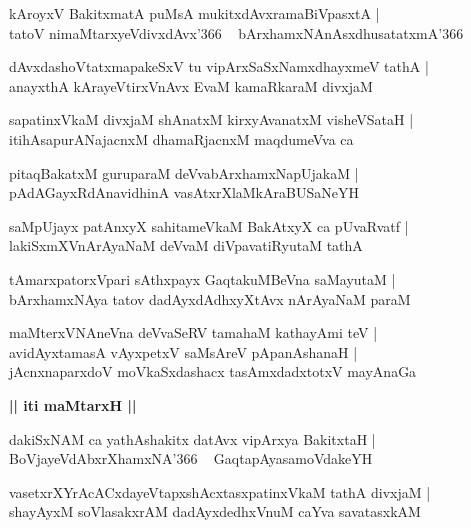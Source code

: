 \documentclass[twoside,12pt,openright]{book}
\newcounter{shloka}[chapter]
\def\uvaca#1{\centerline{{\large\textbf{#1}}}}
\begin{document}
\begin{shloka}%
kAroyxV BakitxmatA puMsA mukitxdAvxramaBiVpasxtA |\\
tatoV nimaMtarxyeVdivxdAvx\char'366 ~ bArxhamxNAnAsxdhusatatxmA\char'366
\end{shloka}

\begin{shloka}%
dAvxdashoVtatxmapakeSxV tu vipArxSaSxNamxdhayxmeV tathA |\\
anayxthA kArayeVtirxVnAvx EvaM kamaRkaraM divxjaM 
\end{shloka}

\begin{shloka}%
sapatinxVkaM divxjaM shAnatxM kirxyAvanatxM visheVSataH |\\
itihAsapurANajacnxM dhamaRjacnxM maqdumeVva ca 
\end{shloka}

\begin{shloka}%
pitaqBakatxM guruparaM deVvabArxhamxNapUjakaM |\\
pAdAGayxRdAnavidhinA vasAtxrXlaMkAraBUSaNeYH
\end{shloka}

\begin{shloka}%
saMpUjayx patAnxyX sahitameVkaM BakAtxyX ca pUvaRvatf |\\
lakiSxmXVnArAyaNaM deVvaM diVpavatiRyutaM tathA
\end{shloka}

\begin{shloka}%
tAmarxpatorxVpari sAthxpayx GaqtakuMBeVna saMayutaM |\\
bArxhamxNAya tatov dadAyxdAdhxyXtAvx nArAyaNaM paraM 
\end{shloka}

\begin{shloka}%
maMterxVNAneVna deVvaSeRV tamahaM kathayAmi teV |\\
avidAyxtamasA vAyxpetxV saMsAreV pApanAshanaH |\\
jAcnxnaparxdoV moVkaSxdashacx tasAmxdadxtotxV mayAnaGa
\end{shloka}

\uvaca{|| iti maMtarxH ||}

\begin{shloka}%
dakiSxNAM ca yathAshakitx datAvx vipArxya BakitxtaH |\\
BoVjayeVdAbxrXhamxNA\char'366 ~ GaqtapAyasamoVdakeYH
\end{shloka}

\begin{shloka}%
vasetxrXYrAcACxdayeVtapxshAcxtasxpatinxVkaM tathA divxjaM |\\
shayAyxM soVlasakxrAM dadAyxdedhxVnuM caYva savatasxkAM
\end{shloka}
\end{document}
